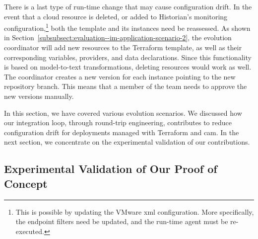 There is a last type of run-time change that may cause configuration drift. In the event that a cloud resource is deleted, or added to Historian's monitoring configuration,\footnote{This is possible by updating the VMware \acrshort{xml} configuration. More specifically, the endpoint filters need be updated, and the run-time agent must be re-executed.} both the template and its instances need be reassessed. As shown in Section~\ref{subsubsect:evaluation--im-application-scenario-2}, the evolution coordinator will add new resources to the Terraform template, as well as their corresponding variables, providers, and data declarations. Since this functionality is based on model-to-text transformations, deleting resources would work as well. The coordinator creates a new version for each instance pointing to the new repository branch. This means that a member of the team needs to approve the new versions manually.

In this section, we have covered various evolution scenarios. We discussed how our integration loop, through round-trip engineering, contributes to reduce configuration drift for deployments managed with Terraform and \gls{cam}. In the next section, we concentrate on the experimental validation of our contributions.

\subsection{Experimental Validation of Our Proof of Concept}
\label{subsect:evaluation--im-experimental-validation}


